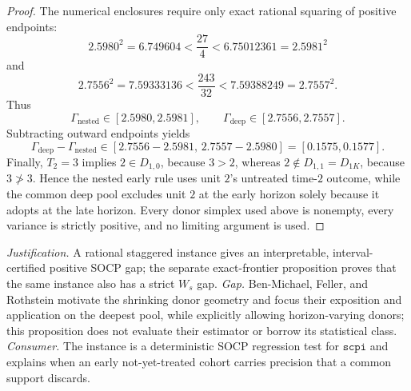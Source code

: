 \documentclass{article}
\begin{document}
\begin{proof}
The numerical enclosures require only exact rational squaring of positive
endpoints:
\[
 2.5980^2=6.749604<\frac{27}{4}<6.75012361=2.5981^2
\]
and
\[
 2.7556^2=7.59333136<\frac{243}{32}<7.59388249=2.7557^2.
\]
Thus
\[
 \Gamma_{\mathrm{nested}}\in[2.5980,2.5981],
 \qquad
 \Gamma_{\mathrm{deep}}\in[2.7556,2.7557].
\]
Subtracting outward endpoints yields
\[
 \Gamma_{\mathrm{deep}}-\Gamma_{\mathrm{nested}}
 \in[2.7556-2.5981,\,2.7557-2.5980]
 =[0.1575,0.1577]. \tag{7}
\]
Finally, \(T_2=3\) implies \(2\in D_{1,0}\), because \(3>2\), whereas
\(2\notin D_{1,1}=D_{1K}\), because \(3\not>3\).  Hence the nested early
rule uses unit \(2\)'s untreated time-\(2\) outcome, while the common deep
pool excludes unit \(2\) at the early horizon solely because it adopts at the
late horizon.  Every donor simplex used above is nonempty, every variance is
strictly positive, and no limiting argument is used.
\end{proof}
\par\smallskip\noindent \textit{Justification.} A rational staggered instance gives an interpretable, interval-certified positive SOCP gap; the separate exact-frontier proposition proves that the same instance also has a strict \(W_s\) gap. \textit{Gap.} Ben-Michael, Feller, and Rothstein motivate the shrinking donor geometry and focus their exposition and application on the deepest pool, while explicitly allowing horizon-varying donors; this proposition does not evaluate their estimator or borrow its statistical class. \textit{Consumer.} The instance is a deterministic SOCP regression test for \(\texttt{scpi}\) and explains when an early not-yet-treated cohort carries precision that a common support discards.
\end{document}
